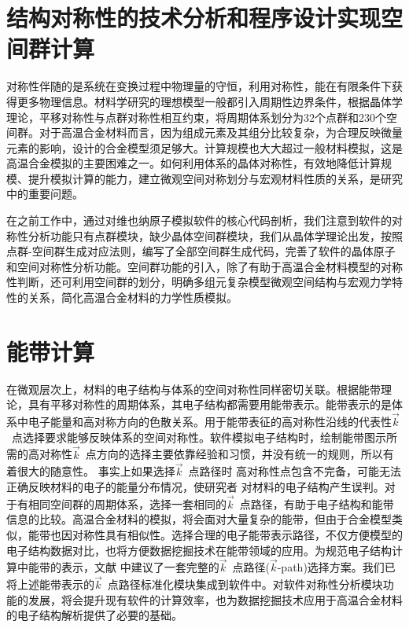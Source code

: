 \section{结构对称性的技术分析和程序设计实现空间群计算}
对称性伴随的是系统在变换过程中物理量的守恒，利用对称性，能在有限条件下获得更多物理信息。材料学研究的理想模型一般都引入周期性边界条件，根据晶体学理论，平移对称性与点群对称性相互约束，将周期体系划分为32个点群和230个空间群。对于高温合金材料而言，因为组成元素及其组分比较复杂，为合理反映微量元素的影响，设计的合金模型须足够大。计算规模也大大超过一般材料模拟，这是高温合金模拟的主要困难之一。如何利用体系的晶体对称性，有效地降低计算规模、提升模拟计算的能力，建立微观空间对称划分与宏观材料性质的关系，是研究中的重要问题。

在之前工作中，通过对维也纳原子模拟软件的核心代码剖析，我们注意到软件的对称性分析功能只有点群模块，缺少晶体空间群模块，我们从晶体学理论出发，按照点群-空间群生成对应法则，编写了全部空间群生成代码，完善了软件的晶体原子和空间对称性分析功能。空间群功能的引入，除了有助于高温合金材料模型的对称性判断，还可利用空间群的划分，明确多组元复杂模型微观空间结构与宏观力学特性的关系，简化高温合金材料的力学性质模拟。

\section{能带计算}
在微观层次上，材料的电子结构与体系的空间对称性同样密切关联。根据能带理论，具有平移对称性的周期体系，其电子结构都需要用能带表示。能带表示的是体系中电子能量和高对称方向的色散关系。用于能带表征的高对称性沿线的代表性$\vec k$~点选择要求能够反映体系的空间对称性。软件模拟电子结构时，绘制能带图示所需的高对称性$\vec k$~点方向的选择主要依靠经验和习惯，并没有统一的规则，所以有着很大的随意性。%
事实上如果选择$\vec k$~点路径时%
高对称性点包含不完备，可能无法正确反映材料的电子的能量分布情况，使研究者%
对材料的电子结构产生误判。对于有相同空间群的周期体系，选择一套相同的$\vec k$~点路径，有助于电子结构和能带信息的比较。高温合金材料的模拟，将会面对大量复杂的能带，但由于合金模型类似，能带也因对称性具有相似性。选择合理的电子能带表示路径，不仅方便模型的电子结构数据对比，也将方便数据挖掘技术在能带领域的应用。为规范电子结构计算中能带的表示，文献%
中建议了一套完整的$\vec k$~点路径($\vec k$-\textrm{path})选择方案。我们已将上述能带表示的$\vec k$~点路径标准化模块集成到软件中。对软件对称性分析模块功能的发展，将会提升现有软件的计算效率，也为数据挖掘技术应用于高温合金材料的电子结构解析提供了必要的基础。


